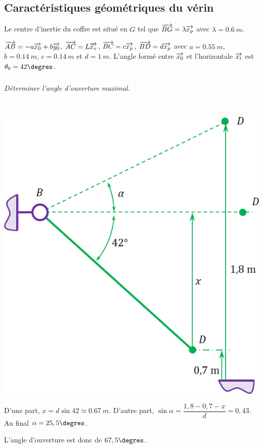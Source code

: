 \documentclass[10pt,fleqn]{article} %
\begin{document}
\begin{multicols}{2}
\begin{multicols}{2}
\subsection*{Caractéristiques géométriques du vérin}
Le centre d’inertie du coffre est situé en $G$ tel que $\overrightarrow{BG}=\lambda\overrightarrow{x_p}$ avec $\lambda=\SI{0,6}{m}$.

$\overrightarrow{AB}=-a\overrightarrow{x_0}+b\overrightarrow{y_0}$, $\overrightarrow{AC}=L\overrightarrow{x_v}$, $\overrightarrow{BC}=c\overrightarrow{x_p}$, $\overrightarrow{BD}=d\overrightarrow{x_p}$ avec $a=\SI{0,55}{m}$, $b=\SI{0,14}{m}$, $c=\SI{0,14}{m}$  et $d=\SI{1}{m}$. L’angle formé entre $\overrightarrow{x_0}$ et l’horizontale $\overrightarrow{x_t}$ est $\theta_0 = 42\degres$.

\subparagraph{}
\textit{Déterminer l’angle d’ouverture maximal.}
\ifprof
\begin{corrige}~\\
\begin{center}
\includegraphics[width=\linewidth]{images/cor_01}
\end{center}
D'une part, $x = d\sin 42 \simeq \SI{0,67}{m}$. D'autre part, $\sin\alpha = \dfrac{1,8-0,7-x}{d}=0,43$. Au final $\alpha = 25,5\degres$. 

L'angle d'ouverture est donc de $67,5\degres$.


\end{corrige}
\end{multicols}
\end{multicols}
\end{document}
